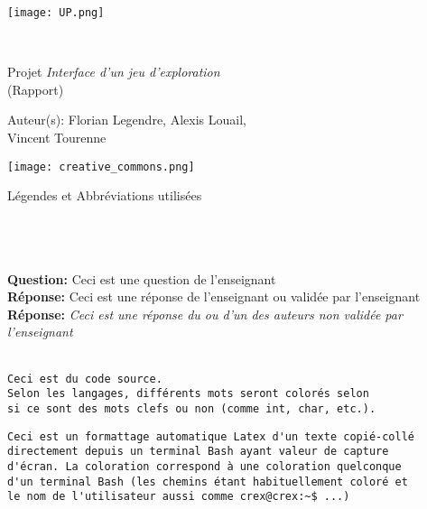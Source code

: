 \documentclass[a4paper, french]{report}
\begin{document}
\begin{titlepage}
    \begin{flushleft}
        \texttt{[image: UP.png]}\par
        \centering
        
        \vspace{13\baselineskip}       
        \HRule \\[0.4cm]

        {\Huge 
        Projet \textit{Interface d'un jeu d'exploration}\\ (Rapport)\par}
        \vspace{0.4cm}
        \HRule
        \vfill
      
        Auteur(s): Florian Legendre, Alexis Louail,\\Vincent Tourenne\medskip \par
        
        \texttt{[image: creative\_commons.png]}\par
    \end{flushleft}
\end{titlepage}

\newpage
\begin{LARGE}
Légendes et Abbréviations utilisées\\\\\\\\
\end{LARGE}
\textbf{Question:} Ceci est une question de l'enseignant\\
\textbf{Réponse:} Ceci est une réponse de l'enseignant ou validée par l'enseignant\\
\textbf{Réponse:} \textit{Ceci est une réponse du ou d'un des auteurs non validée par l'enseignant}\\\\

\begin{lstlisting}[style=C, caption=Exemple de code source]
Ceci est du code source.
Selon les langages, différents mots seront colorés selon 
si ce sont des mots clefs ou non (comme int, char, etc.).
\end{lstlisting}

\begin{mdframed}[style=Bash]
\begin{lstlisting}[style=Bash, caption=Exemple d'une pseudo capture d'écran Bash]
Ceci est un formattage automatique Latex d'un texte copié-collé
directement depuis un terminal Bash ayant valeur de capture
d'écran. La coloration correspond à une coloration quelconque 
d'un terminal Bash (les chemins étant habituellement coloré et 
le nom de l'utilisateur aussi comme crex@crex:~$ ...)
\end{lstlisting}
\end{mdframed}
\end{document}

